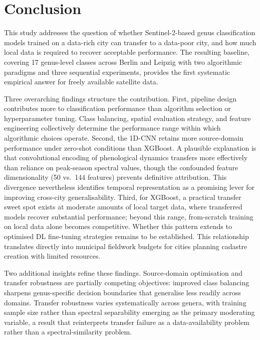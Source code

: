 \documentclass[11pt,a4paper]{scrartcl}
\begin{document}
\section{Conclusion}\label{conclusion}

This study addresses the question of whether Sentinel-2-based genus
classification models trained on a data-rich city can transfer to a
data-poor city, and how much local data is required to recover
acceptable performance. The resulting baseline, covering 17 genus-level
classes across Berlin and Leipzig with two algorithmic paradigms and
three sequential experiments, provides the first systematic empirical
answer for freely available satellite data.

Three overarching findings structure the contribution. First, pipeline
design contributes more to classification performance than algorithm
selection or hyperparameter tuning. Class balancing, spatial evaluation
strategy, and feature engineering collectively determine the performance
range within which algorithmic choices operate. Second, the 1D-CNN
retains more source-domain performance under zero-shot conditions than
XGBoost. A plausible explanation is that convolutional encoding of
phenological dynamics transfers more effectively than reliance on
peak-season spectral values, though the confounded feature
dimensionality (50 vs.~144 features) prevents definitive attribution.
This divergence nevertheless identifies temporal representation as a
promising lever for improving cross-city generalisability. Third, for
XGBoost, a practical transfer sweet spot exists at moderate amounts of
local target data, where transferred models recover substantial
performance; beyond this range, from-scratch training on local data
alone becomes competitive. Whether this pattern extends to optimised DL
fine-tuning strategies remains to be established. This relationship
translates directly into municipal fieldwork budgets for cities planning
cadastre creation with limited resources.

Two additional insights refine these findings. Source-domain
optimisation and transfer robustness are partially competing objectives:
improved class balancing sharpens genus-specific decision boundaries
that generalise less readily across domains. Transfer robustness varies
systematically across genera, with training sample size rather than
spectral separability emerging as the primary moderating variable, a
result that reinterprets transfer failure as a data-availability problem
rather than a spectral-similarity problem.
\end{document}
